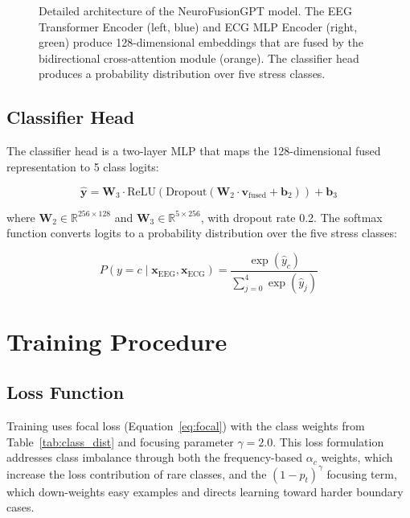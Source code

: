 \documentclass[12pt,letterpaper]{report}
\begin{document}
\begin{figure}[H]
\begin{tikzpicture}
\end{tikzpicture}
\caption[Detailed NeuroFusionGPT architecture]{Detailed architecture of the NeuroFusionGPT model. The EEG Transformer Encoder (left, blue) and ECG MLP Encoder (right, green) produce 128-dimensional embeddings that are fused by the bidirectional cross-attention module (orange). The classifier head produces a probability distribution over five stress classes.}
\label{fig:architecture}
\end{figure}

\subsection{Classifier Head}
\label{subsec:classifier}

The classifier head is a two-layer MLP that maps the 128-dimensional fused representation to 5 class logits:

\begin{equation}
\label{eq:classifier}
\hat{\mathbf{y}} = \mathbf{W}_3 \cdot \text{ReLU}\left(\text{Dropout}\left(\mathbf{W}_2 \cdot \mathbf{v}_{\text{fused}} + \mathbf{b}_2\right)\right) + \mathbf{b}_3
\end{equation}

\noindent where $\mathbf{W}_2 \in \mathbb{R}^{256 \times 128}$ and $\mathbf{W}_3 \in \mathbb{R}^{5 \times 256}$, with dropout rate 0.2. The softmax function converts logits to a probability distribution over the five stress classes:

\begin{equation}
\label{eq:softmax}
P(y = c \mid \mathbf{x}_{\text{EEG}}, \mathbf{x}_{\text{ECG}}) = \frac{\exp(\hat{y}_c)}{\sum_{j=0}^{4} \exp(\hat{y}_j)}
\end{equation}

\section{Training Procedure}
\label{sec:training}

\subsection{Loss Function}
\label{subsec:loss}

Training uses focal loss (Equation~\ref{eq:focal}) with the class weights from Table~\ref{tab:class_dist} and focusing parameter $\gamma = 2.0$. This loss formulation addresses class imbalance through both the frequency-based $\alpha_c$ weights, which increase the loss contribution of rare classes, and the $(1 - p_t)^{\gamma}$ focusing term, which down-weights easy examples and directs learning toward harder boundary cases.
\end{document}
